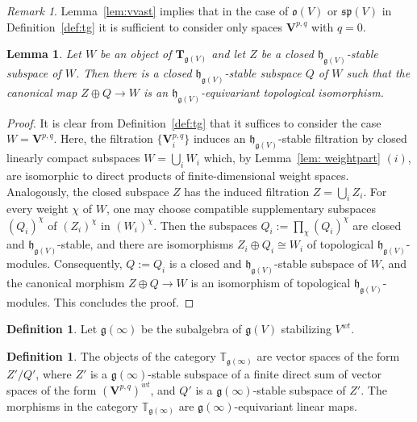 \documentclass[12pt,reqno]{amsart}
\newtheorem{lem}[thm]{Lemma}
\theoremstyle{definition}
\newtheorem{defn}[thm]{Definition}
\theoremstyle{remark}
\newtheorem{rmk}[thm]{Remark}
\begin{document}
        \begin{rmk}
            Lemma~\ref{lem:vvast} implies that in the case of
            $\mathfrak{o}(V)$ or $\mathfrak{sp}(V)$ in Definition~\ref{def:tg}
            it is sufficient to consider only spaces $\mathbf{V}^{p,q}$ with $q=0$.
        \end{rmk}

        \begin{lem}\label{T-split}
		Let $W$ be an object of $\mathbf{T}_{\mathfrak{g}(V)}$ and let $Z$ be a closed $\mathfrak{h}_{\mathfrak{g}(V)}$-stable subspace of $W$. Then there is a closed $\mathfrak{h}_{\mathfrak{g}(V)}$-stable subspace $Q$ of $W$ such that the canonical map $Z\oplus Q \rightarrow W$ is an $\mathfrak{h}_{\mathfrak{g}(V)}$-equivariant topological isomorphism. 
	\end{lem}
	
	\begin{proof}	    
	    It is clear from Definition~\ref{def:tg} that it suffices to consider the case $W = \mathbf{V}^{p,q}$. Here, the filtration $\{\mathbf{V}^{p,q}_{i}\}$ induces an $\mathfrak{h}_{\mathfrak{g}(V)}$-stable filtration by closed linearly compact subspaces 
	    $W = \bigcup_{i} W_{i}$ which, by Lemma~\ref{lem: weightpart} $(i)$, are isomorphic to direct products of finite-dimensional weight spaces. Analogously, the closed subspace $Z$ has the induced filtration $Z = \bigcup_{i} Z_{i}$.  For every weight $\chi$ of $W$, one may choose compatible supplementary subspaces $(Q_{i})^\chi$ of $(Z_{i})^\chi$ in $(W_{i})^\chi$. Then the subspaces $Q_{i} := \prod_\chi (Q_{i})^\chi$ are closed and $\mathfrak{h}_{\mathfrak{g}(V)}$-stable, and  there are isomorphisms $Z_{i} \oplus Q_{i} \cong W_{i}$ of topological $\mathfrak{h}_{\mathfrak{g}(V)}$-modules. Consequently, $Q:=Q_{i}$  is a closed and $\mathfrak{h}_{\mathfrak{g}(V)}$-stable subspace of $W$, and the canonical morphism $Z\oplus Q \rightarrow W$ is an isomorphism of topological $\mathfrak{h}_{\mathfrak{g}(V)}$-modules. This concludes the proof.
	\end{proof}
	
	
	
	

        \begin{defn}\label{def:gvw}
            Let $\mathfrak{g}(\infty)$ be the subalgebra of $\mathfrak{g}(V)$ stabilizing $V^{wt}$.
        \end{defn}

        \begin{defn}\label{tgvw}
            The objects of the category $\mathbb{T}_{\mathfrak{g}(\infty)}$ are vector spaces of the form $Z'/Q'$, where $Z'$ is a $\mathfrak{g}(\infty)$-stable subspace of a finite direct sum of vector spaces of the form $(\mathbf{V}^{p,q})^{wt}$, and $Q'$ is a $\mathfrak{g}(\infty)$-stable subspace of $Z'$. 
            The morphisms in the category $\mathbb{T}_{\mathfrak{g}(\infty)}$ are $\mathfrak{g}(\infty)$-equivariant linear maps.
        \end{defn}
\end{document}
